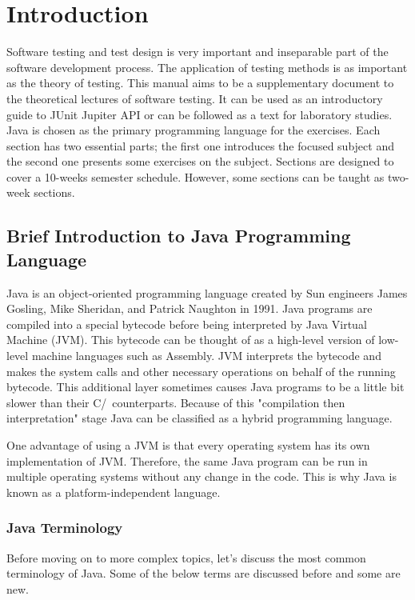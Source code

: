 \chapter{Introduction}
\label{ch:introduction}
Software testing and test design is very important and inseparable part of the software development process. The application of testing methods is as important as the theory of testing. This manual aims to be a supplementary document to the theoretical lectures of software testing. It can be used as an introductory guide to JUnit Jupiter API or can be followed as a text for laboratory studies. Java is chosen as the primary programming language for the exercises. Each section has two essential parts; the first one introduces the focused subject and the second one presents some exercises on the subject. Sections are designed to cover a 10-weeks semester schedule. However, some sections can be taught as two-week sections.

\section{Brief Introduction to Java Programming Language}
Java is an object-oriented programming language created by Sun engineers James Gosling, Mike Sheridan, and Patrick Naughton in 1991. Java programs are compiled into a special bytecode before being interpreted by Java Virtual Machine (JVM). This bytecode can be thought of as a high-level version of low-level machine languages such as Assembly. JVM interprets the bytecode and makes the system calls and other necessary operations on behalf of the running bytecode. This additional layer sometimes causes Java programs to be a little bit slower than their C/\CC~counterparts. Because of this "compilation then interpretation" stage Java can be classified as a hybrid programming language. 

One advantage of using a JVM is that every operating system has its own implementation of JVM. Therefore, the same Java program can be run in multiple operating systems without any change in the code. This is why Java is known as a platform-independent language.

\subsection{Java Terminology}
Before moving on to more complex topics, let's discuss the most common terminology of Java. Some of the below terms are discussed before and some are new.

